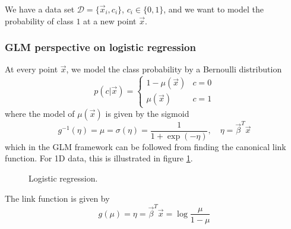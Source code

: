 We have a data set $\mathcal{D} = \{ \vec{x}_i, c_i \}$, $c_i \in \{0, 1\}$, and we want to model the probability of class $1$ at a new point $\vec{x}$.

\subsubsection{GLM perspective on logistic regression}
At every point $\vec{x}$, we model the class probability by a Bernoulli distribution
\begin{equation}
    p(c | \vec{x}) = \begin{cases}
        1- \mu(\vec{x}) & c = 0 \\
        \mu(\vec{x}) & c = 1
    \end{cases}
\end{equation}
where the model of $\mu(\vec{x})$ is given by the sigmoid
\begin{equation}
    g^{-1}(\eta) = \mu = \sigma(\eta) = \frac{1}{1 + \exp(-\eta)}, \quad \eta = \vec{\beta}^T \vec{x}
\end{equation}
which in the GLM framework can be followed from finding the canonical link function. For 1D data,
this is illustrated in figure \ref{fig:logistic_regression}.

\begin{figure}[!htb]
    \centering
    
    \caption{Logistic regression.}
    \label{fig:logistic_regression}
\end{figure}


The link function is given by
\begin{equation}
    g(\mu) = \eta = \vec{\beta}^T \vec{x} = \log \frac{\mu}{1-\mu}
\end{equation}


